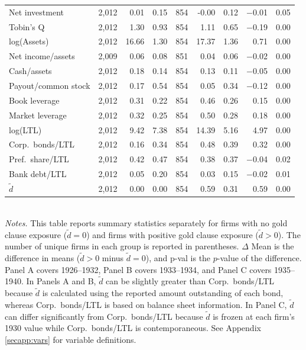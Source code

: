 \begin{table}[p]
\begin{threeparttable}
\begin{tabular}{l rrr rrr rr}
            Net investment & 2,012 & 0.01 & 0.15 & 854 & -0.00 & 0.12 & $-$0.01 & 0.05 \\
            Tobin's Q & 2,012 & 1.30 & 0.93 & 854 & 1.11 & 0.65 & $-$0.19 & 0.00 \\
            log(Assets) & 2,012 & 16.66 & 1.30 & 854 & 17.37 & 1.36 & 0.71 & 0.00 \\
            Net income/assets & 2,009 & 0.06 & 0.08 & 851 & 0.04 & 0.06 & $-$0.02 & 0.00 \\
            Cash/assets & 2,012 & 0.18 & 0.14 & 854 & 0.13 & 0.11 & $-$0.05 & 0.00 \\
            Payout/common stock & 2,012 & 0.17 & 0.54 & 854 & 0.05 & 0.34 & $-$0.12 & 0.00 \\
            Book leverage & 2,012 & 0.31 & 0.22 & 854 & 0.46 & 0.26 & 0.15 & 0.00 \\
            Market leverage & 2,012 & 0.32 & 0.25 & 854 & 0.50 & 0.28 & 0.18 & 0.00 \\
            log(LTL) & 2,012 & 9.42 & 7.38 & 854 & 14.39 & 5.16 & 4.97 & 0.00 \\
            Corp.\ bonds/LTL & 2,012 & 0.16 & 0.34 & 854 & 0.48 & 0.39 & 0.32 & 0.00 \\
            Pref.\ share/LTL & 2,012 & 0.42 & 0.47 & 854 & 0.38 & 0.37 & $-$0.04 & 0.02 \\
            Bank debt/LTL & 2,012 & 0.05 & 0.20 & 854 & 0.03 & 0.15 & $-$0.02 & 0.01 \\
            \ensuremath{\tilde{d}} & 2,012 & 0.00 & 0.00 & 854 & 0.59 & 0.31 & 0.59 & 0.00 \\
            \bottomrule
        \end{tabular}
    \end{threeparttable}\\
    
    \vspace*{3mm} \justifying \noindent
    \scriptsize{\textit{Notes.} This table reports summary statistics separately for firms with no gold clause exposure ($\tilde{d} = 0$) and firms with positive gold clause exposure ($\tilde{d} > 0$). The number of unique firms in each group is reported in parentheses. $\Delta$ Mean is the difference in means ($\tilde{d} > 0$ minus $\tilde{d} = 0$), and p-val is the $p$-value of the difference. Panel A covers 1926--1932, Panel B covers 1933--1934, and Panel C covers 1935--1940. In Panels A and B, $\tilde{d}$ can be slightly greater than Corp.\ bonds/LTL because $\tilde{d}$ is calculated using the reported amount outstanding of each bond, whereas Corp.\ bonds/LTL is based on balance sheet information. In Panel C, $\tilde{d}$ can differ significantly from Corp.\ bonds/LTL because $\tilde{d}$ is frozen at each firm's 1930 value while Corp.\ bonds/LTL is contemporaneous. See Appendix \ref{secapp:vars} for variable definitions.}
\end{table}

